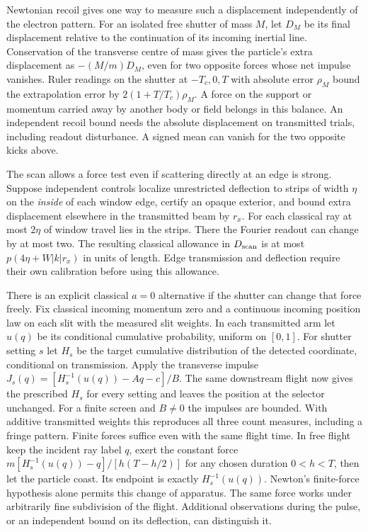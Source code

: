 \documentclass[11pt,a4paper]{article}
\begin{document}
Newtonian recoil gives one way to measure such a displacement
independently of the electron pattern. For an isolated free shutter of
mass \(M\), let \(D_M\) be its final displacement relative to the
continuation of its incoming inertial line. Conservation of the
transverse centre of mass gives the particle's extra displacement as
\(-(M/m)D_M\), even for two opposite forces whose net impulse vanishes.
Ruler readings on the shutter at \(-T_c,0,T\) with absolute error
\(\rho_M\) bound the extrapolation error by \(2(1+T/T_c)\rho_M\). A
force on the support or momentum carried away by another body or field
belongs in this balance. An independent recoil bound needs the absolute
displacement on transmitted trials, including readout disturbance. A
signed mean can vanish for the two opposite kicks above.

The scan allows a force test even if scattering directly at an edge is
strong. Suppose independent controls localize unrestricted deflection to
strips of width \(\eta\) on the \emph{inside} of each window edge,
certify an opaque exterior, and bound extra displacement elsewhere in
the transmitted beam by \(r_x\). For each classical ray at most
\(2\eta\) of window travel lies in the strips. There the Fourier readout
can change by at most two. The resulting classical allowance in
\(D_{\rm scan}\) is at most \(p(4\eta+W|k|r_x)\) in units of length.
Edge transmission and deflection require their own calibration before
using this allowance.

There is an explicit classical \(a=0\) alternative if the shutter can
change that force freely. Fix classical incoming momentum zero and a
continuous incoming position law on each slit with the measured slit
weights. In each transmitted arm let \(u(q)\) be its conditional
cumulative probability, uniform on \([0,1]\). For shutter setting \(s\)
let \(H_s\) be the target cumulative distribution of the detected
coordinate, conditional on transmission. Apply the transverse impulse
\(J_s(q)=[H_s^{-1}(u(q))-Aq-c]/B\). The same downstream flight now gives
the prescribed \(H_s\) for every setting and leaves the position at the
selector unchanged. For a finite screen and \(B\ne0\) the impulses are
bounded. With additive transmitted weights this reproduces all three
count measures, including a fringe pattern. Finite forces suffice even
with the same flight time. In free flight keep the incident ray label
\(q\), exert the constant force \(m[H_s^{-1}(u(q))-q]/[h(T-h/2)]\) for
any chosen duration \(0<h<T\), then let the particle coast. Its endpoint
is exactly \(H_s^{-1}(u(q))\). Newton's finite-force hypothesis alone
permits this change of apparatus. The same force works under arbitrarily
fine subdivision of the flight. Additional observations during the
pulse, or an independent bound on its deflection, can distinguish it.
\end{document}

